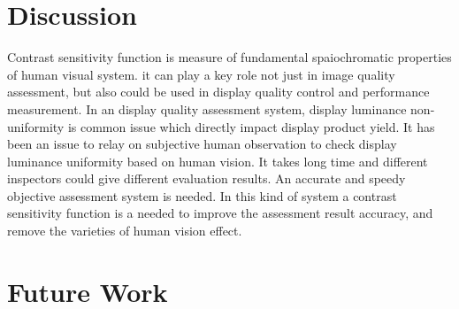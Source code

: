 \documentclass{article}
\begin{document}
\section{Discussion}
Contrast sensitivity function is measure of fundamental spaiochromatic properties of human visual system. it can play a key role not just in image quality assessment, but also could be used in display quality control and performance measurement. In an display quality assessment system, display luminance non-uniformity is common issue which directly impact display product yield. It has been an issue to relay on subjective human observation to check display luminance uniformity based on human vision. It takes long time and different inspectors could give different evaluation results. An accurate and speedy objective assessment system is needed. In this kind of system a contrast sensitivity function is a needed to improve the assessment result accuracy, and remove the varieties of human vision effect.

\section{Future Work}
\end{document}

